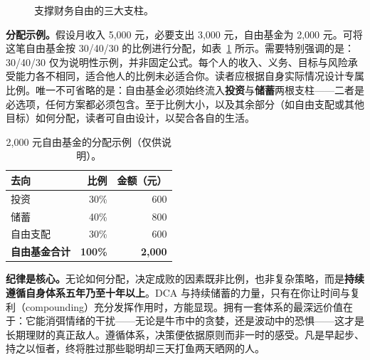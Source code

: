 \documentclass[11pt,a4paper,twocolumn]{article}
\begin{document}
\begin{figure}[t]
\centering
{}
\caption{支撑财务自由的三大支柱。}
\label{fig:pillars}
\end{figure}

\textbf{分配示例。}假设月收入 5{,}000 元，必要支出 3{,}000 元，自由基金为 2{,}000 元。可将这笔自由基金按 30/40/30 的比例进行分配，如表~\ref{tab:alloc} 所示。需要特别强调的是：30/40/30 仅为说明性示例，并非固定公式。每个人的收入、义务、目标与风险承受能力各不相同，适合他人的比例未必适合你。读者应根据自身实际情况设计专属比例。唯一不可省略的是：自由基金必须始终流入\textbf{投资}与\textbf{储蓄}两根支柱——二者是必选项，任何方案都必须包含。至于比例大小，以及其余部分（如自由支配或其他目标）如何分配，读者可自由设计，以契合各自的生活。

\begin{table}[t]
\centering
\small
\begin{tabular}{lrr}
\toprule
\rowcolor{accent!15}
\textbf{去向} & \textbf{比例} & \textbf{金额（元）} \\
\midrule
投资   & 30\% & 600 \\
储蓄   & 40\% & 800 \\
自由支配 & 30\% & 600 \\
\midrule
\textbf{自由基金合计} & \textbf{100\%} & \textbf{2{,}000} \\
\bottomrule
\end{tabular}
\caption{2,000 元自由基金的分配示例（仅供说明）。}
\label{tab:alloc}
\end{table}

\textbf{纪律是核心。}无论如何分配，决定成败的因素既非比例，也非复杂策略，而是\textbf{持续遵循自身体系五年乃至十年以上}。DCA 与持续储蓄的力量，只有在你让时间与复利（compounding）充分发挥作用时，方能显现。拥有一套体系的最深远价值在于：它能消弭情绪的干扰——无论是牛市中的贪婪，还是波动中的恐惧——这才是长期理财的真正敌人。遵循体系，决策便依据原则而非一时的感受。凡是早起步、持之以恒者，终将胜过那些聪明却三天打鱼两天晒网的人。
\end{document}
